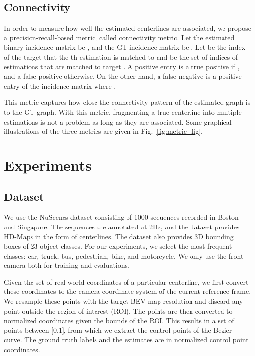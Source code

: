 \documentclass[10pt,twocolumn,letterpaper]{article}
\begin{document}
\subsection{Connectivity}

In order to measure how well the estimated centerlines are associated, we propose a precision-recall-based metric, called connectivity metric. Let the estimated binary incidence matrix be , and the GT incidence matrix be . Let  be the index of the target that the th estimation is matched to and  be the set of indices of estimations that are matched to target . A positive entry  is a true positive if , and a false positive otherwise. On the other hand, a false negative is a positive entry of the incidence matrix  where . 

This metric captures how close the connectivity pattern of the estimated graph is to the GT graph. With this metric, fragmenting a true centerline into multiple estimations is not a problem as long as they are associated. Some graphical illustrations of the three metrics are given in Fig.~\ref{fig:metric_fig}. 






\section{Experiments}

\subsection{Dataset}

We use the NuScenes \cite{nuscenes2019} dataset consisting of 1000 sequences recorded in Boston and Singapore. The sequences are annotated at 2Hz, and the dataset provides HD-Maps in the form of centerlines. The dataset also provides 3D bounding boxes of 23 object classes. For our experiments, we select the most frequent classes: car, truck, bus, pedestrian, bike, and motorcycle. We only use the front camera both for training and evaluations. 

Given the set of real-world coordinates of a particular centerline, we first convert these coordinates to the camera coordinate system of the current reference frame. We resample these points with the target BEV map resolution and discard any point outside the region-of-interest (ROI). The points are then converted to normalized coordinates given the bounds of the ROI. This results in a set of points between [0,1], from which we extract the control points of the Bezier curve. The ground truth labels and the estimates are in normalized control point coordinates. 
\end{document}
